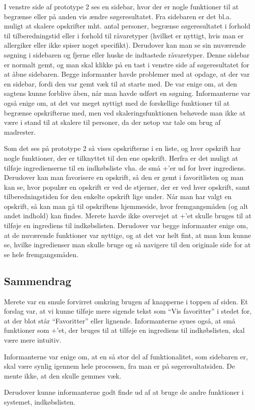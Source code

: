 I venstre side af prototype 2 ses en sidebar, hvor der er nogle funktioner til at begrænse eller på anden vis ændre søgeresultatet. Fra sidebaren er det bl.a. muligt at skalere opskrifter mht. antal personer, begrænse søgeresultatet i forhold til tilberedningstid eller i forhold til råvaretyper (hvilket er nyttigt, hvis man \fx er allergiker eller ikke spiser noget specifikt). Derudover kan man se sin nuværende søgning i sidebaren og fjerne eller huske de indtastede råvaretyper. Denne sidebar er normalt gemt, og man skal klikke på en tast i venstre side af søgeresultatet for at åbne sidebaren. Begge informanter havde problemer med at opdage, at der var en sidebar, fordi den var gemt væk til at starte med. De var enige om, at den sagtens kunne forblive åben, når man havde udført en søgning. Informanterne var også enige om, at det var meget nyttigt med de forskellige funktioner til at begrænse opskrifterne med, men \fx ved skaleringsfunktionen behøvede man ikke at være i stand til at skalere til  personer, da der netop var tale om brug af madrester. 

Som det ses på prototype 2 så vises opskrifterne i en liste, og hver opskrift har nogle funktioner, der er tilknyttet til den ene opskrift. Herfra er det muligt at tilføje ingredienserne til en indkøbsliste vha. de små +'er ud for hver ingrediens. Derudover kan man favorisere en opskrift, så den er gemt i favoritlisten og man kan se, hvor populær en opskrift er ved de stjerner, der er ved hver opskrift, samt tilberedningstiden for den enkelte opskrift lige under. Når man har valgt en opskrift, så kan man gå til opskriftens hjemmeside, hvor fremgangsmåden (og alt andet indhold) kan findes. Merete havde ikke overvejet at +'et skulle bruges til at tilføje en ingrediens til indkøbslisten. Derudover var begge informanter enige om, at de nuværende funktioner var nyttige, og at det var helt fint, at man kun kunne se, hvilke ingredienser man skulle bruge og så navigere til den originale side for at se hele fremgangsmåden.

\subsection{Sammendrag}
Merete var en smule forvirret omkring brugen af knapperne i toppen af siden. Et forslag var, at vi kunne tilføje mere sigende tekst som ``Vis favoritter'' i stedet for, at der blot står ``Favoritter'' eller lignende. Informanterne synes også, at små funktioner som +'et, der bruges til at tilføje en ingrediens til indkøbslisten, skal være mere intuitiv.

Informanterne var enige om, at en så stor del af funktionalitet, som sidebaren er, skal være synlig igennem hele processen, fra man er på søgeresultatsiden. De mente ikke, at den skulle gemmes væk.

Derudover kunne informanterne godt finde ud af at bruge de andre funktioner i systemet, \fx indkøbslisten.
